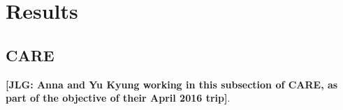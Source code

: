 \section{Results}

\subsection{CARE}

\noindent \textbf{[JLG: Anna and Yu Kyung working in this subsection of CARE, as part of the objective of their April 2016 trip]}.

\renewcommand{\refname}{Appendix References}
\clearpage
\singlespace



 